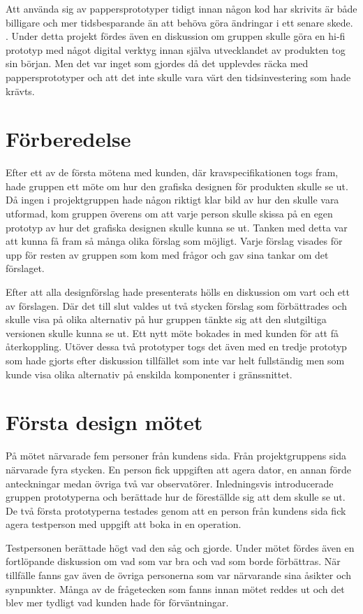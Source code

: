 Att använda sig av pappersprototyper tidigt innan någon kod har skrivits är både billigare och mer tidsbesparande än att 
behöva göra ändringar i ett senare skede. \cite{paper}. Under detta projekt fördes även en diskussion om gruppen skulle 
göra en hi-fi prototyp med något digital verktyg innan själva utvecklandet av produkten tog sin början. Men det var inget 
som gjordes då det upplevdes räcka med pappersprototyper och att det inte skulle vara värt den tidsinvestering som hade 
krävts.      

\section{Förberedelse}
Efter ett av de första mötena med kunden, där kravspecifikationen togs fram, hade gruppen ett möte om hur den grafiska 
designen för produkten  skulle se ut. Då ingen i projektgruppen hade någon riktigt klar bild av hur den skulle vara 
utformad, kom gruppen överens om att varje person skulle skissa på en egen prototyp av hur det grafiska designen skulle 
kunna se ut. Tanken med detta var att kunna få fram så många olika förslag som möjligt. Varje förslag visades för upp för 
resten av gruppen som kom med frågor och gav sina tankar om det förslaget.

Efter att alla designförslag hade presenterats hölls en diskussion om vart och ett av förslagen. Där det till slut valdes 
ut två stycken förslag som förbättrades och skulle visa på olika alternativ på hur gruppen tänkte sig att den slutgiltiga 
versionen skulle kunna se ut. Ett nytt möte bokades in med kunden för att få återkoppling. Utöver dessa två prototyper 
togs det även med en tredje prototyp som hade gjorts efter diskussion tillfället som inte var helt fullständig men som 
kunde visa olika alternativ på enskilda komponenter i gränssnittet.

\section{Första design mötet}
På mötet närvarade fem personer från kundens sida. Från projektgruppens sida närvarade fyra stycken. En person fick 
uppgiften att agera dator, en annan förde anteckningar medan övriga två var observatörer. Inledningsvis introducerade 
gruppen prototyperna och berättade hur de föreställde sig att dem skulle se ut. De två första prototyperna testades genom 
att en person från kundens sida fick agera testperson med uppgift att boka in en operation.

Testpersonen berättade högt vad den såg och gjorde. Under mötet fördes även en fortlöpande diskussion om vad som var bra 
och vad som borde förbättras. När tillfälle fanns gav även de övriga personerna som var närvarande sina åsikter och 
synpunkter. Många av de frågetecken som fanns innan mötet reddes ut och det blev mer tydligt vad kunden hade för 
förväntningar. 

